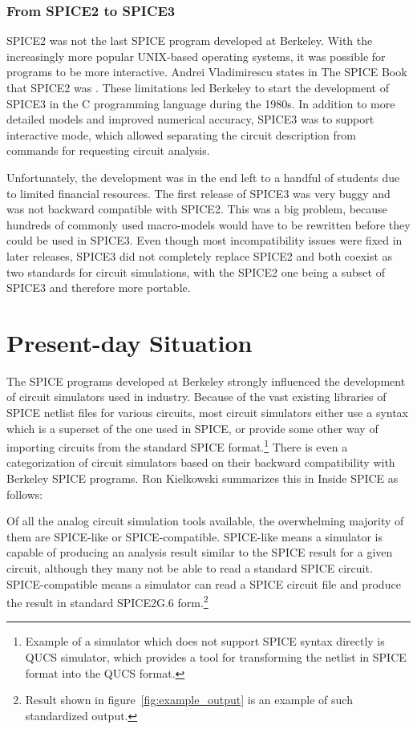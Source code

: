 \subsubsection*{From SPICE2 to SPICE3}
SPICE2 was not the last SPICE program developed at Berkeley. With the increasingly more popular UNIX-based operating systems, it was possible for programs to be more interactive. Andrei Vladimirescu states in The SPICE Book \cite{spice_book} that SPICE2 was . These limitations led Berkeley to start the development of SPICE3 in the C programming language during the 1980s. In addition to more detailed models and improved numerical accuracy, SPICE3 was to support interactive mode, which allowed separating the circuit description from commands for requesting circuit analysis.

Unfortunately, the development was in the end left to a handful of students due to limited financial resources. The first release of SPICE3 was very buggy and was not backward compatible with SPICE2. This was a big problem, because hundreds of commonly used macro-models would have to be rewritten before they could be used in SPICE3. Even though most incompatibility issues were fixed in later releases, SPICE3 did not completely replace SPICE2 and both coexist as two standards for circuit simulations, with the SPICE2 one being a subset of SPICE3 and therefore more portable.

\section{Present-day Situation}
The SPICE programs developed at Berkeley strongly influenced the development of circuit simulators used in industry. Because of the vast existing libraries of SPICE netlist files for various circuits, most circuit simulators either use a syntax which is a superset of the one used in SPICE, or provide some other way of importing circuits from the standard SPICE format.\footnote{Example of a simulator which does not support SPICE syntax directly is QUCS simulator, which provides a tool for transforming the netlist in SPICE format into the QUCS format.} There is even a categorization of circuit simulators based on their backward compatibility with Berkeley SPICE programs. Ron Kielkowski summarizes this in Inside SPICE \cite{inside_spice} as follows:

\begin{blockquote}
	Of all the analog circuit simulation tools available, the overwhelming majority of them are SPICE-like or SPICE-compatible. SPICE-like means a simulator is capable of producing an analysis result similar to the SPICE result for a given circuit, although they many not be able to read a standard SPICE circuit. SPICE-compatible means a simulator can read a SPICE circuit file and produce the result in standard SPICE2G.6 form.\footnote{Result shown in figure~\ref{fig:example_output} is an example of such standardized output.}
\end{blockquote}

